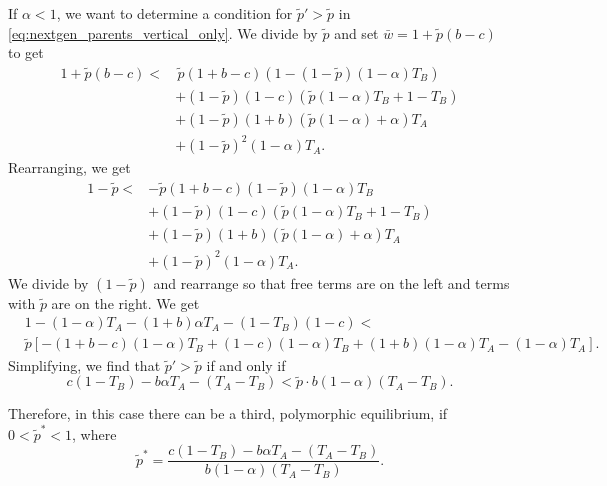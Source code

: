 \documentclass[12pt]{extarticle}
\begin{document}
If $\alpha<1$, we want to determine a condition for $\tilde{p}'>\tilde{p}$ in \autoref{eq:nextgen_parents_vertical_only}. 
We divide  by $\tilde{p}$ and set $\bar{w} = 1 + \tilde{p}(b-c)$ to get
\begin{equation}
\begin{aligned} 
  1 + \tilde{p}(b-c) < 
  & \, \tilde{p}(1+b-c) (1 - (1-\tilde{p}) (1-\alpha) T_B) \\
  & + (1-\tilde{p}) (1-c) (\tilde{p} (1-\alpha) T_B + 1 - T_B) \\
  & + (1-\tilde{p}) (1+b) (\tilde{p} (1-\alpha) + \alpha) T_A \\
  & + (1-\tilde{p})^2 (1-\alpha) T_A .
\end{aligned}
\end{equation}
Rearranging, we get
\begin{equation} 
\begin{aligned} 
  1 - \tilde{p} < 
  & - \tilde{p}(1+b-c)(1-\tilde{p}) (1-\alpha) T_B \\
  & + (1-\tilde{p}) (1-c) (\tilde{p} (1-\alpha) T_B + 1 - T_B) \\
  & + (1-\tilde{p}) (1+b) (\tilde{p} (1-\alpha) + \alpha) T_A \\
  & + (1-\tilde{p})^2 (1-\alpha) T_A .
\end{aligned}
\end{equation}
We divide by $(1-\tilde{p})$ and rearrange so that free terms are on the left and terms with $\tilde{p}$ are on the right. We get
\begin{equation} 
\begin{aligned} 
  &1 - (1-\alpha) T_A - (1+b) \alpha T_A - (1 - T_B)(1-c)  < \\
   &\tilde{p}[ - (1+b-c) (1-\alpha) T_B 
   + (1-c) (1-\alpha) T_B
   + (1+b) (1-\alpha) T_A 
   - (1-\alpha) T_A].
\end{aligned}
\end{equation}
Simplifying, we find that $\tilde{p}'>\tilde{p}$ if and only if
\begin{equation} \label{eq:vert_hori_global_condition}
c(1-T_B) - b \alpha T_A - (T_A-T_B) < \tilde{p} \cdot b (1-\alpha) (T_A-T_B).
\end{equation}

Therefore, in this case there can be a third, polymorphic equilibrium, if $0<\tilde{p}^*<1$, where
\begin{equation} \label{eq:vert_hori_equilibrium}
  \tilde{p}^* = 
  \frac{c(1-T_B) - b \alpha T_A - (T_A-T_B)}{b (1-\alpha) (T_A-T_B) }.
\end{equation} 
\end{document}
